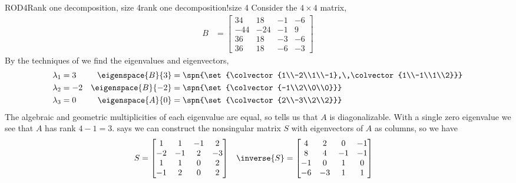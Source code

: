 %
\begin{example}{ROD4}{Rank one decomposition, size 4}{rank one decomposition!size 4}
Consider the $4\times4$ matrix,
%
\begin{align*}
B&=
\begin{bmatrix}
 34 & 18 & -1 & -6 \\
 -44 & -24 & -1 & 9 \\
 36 & 18 & -3 & -6 \\
 36 & 18 & -6 & -3
\end{bmatrix}
%
\end{align*}
%
By the techniques of  we find the eigenvalues and eigenvectors,
%
\begin{align*}
\lambda_1&=3
&
\eigenspace{B}{3}&=\spn{\set{\colvector{1\\-2\\1\\-1},\,\colvector{1\\-1\\1\\2}}}\\
%
\lambda_2&=-2
&
\eigenspace{B}{-2}&=\spn{\set{\colvector{-1\\2\\0\\0}}}\\
%
\lambda_3&=0
&
\eigenspace{A}{0}&=\spn{\set{\colvector{2\\-3\\2\\2}}}
\end{align*}
%
The algebraic and geometric multiplicities of each eigenvalue are equal, so  tells us that $A$ is diagonalizable.  With a single zero eigenvalue we see that $A$ has rank $4-1=3$.   says we can construct the nonsingular matrix $S$ with eigenvectors of $A$ as columns, so we have
%
\begin{align*}
S&=
\begin{bmatrix}
 1 & 1 & -1 & 2 \\
 -2 & -1 & 2 & -3 \\
 1 & 1 & 0 & 2 \\
 -1 & 2 & 0 & 2
\end{bmatrix}
&
\inverse{S}&=
%
\begin{bmatrix}
 4 & 2 & 0 & -1 \\
 8 & 4 & -1 & -1 \\
 -1 & 0 & 1 & 0 \\
 -6 & -3 & 1 & 1
\end{bmatrix}

\end{align*}
\end{example}
